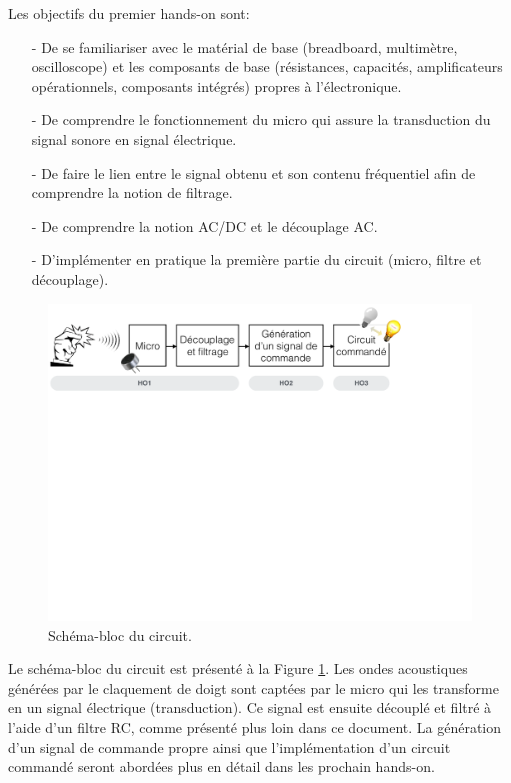 
Les objectifs du premier hands-on sont:

\begin{itemize}
	\item[-] De se familiariser avec le matérial de base (breadboard, multimètre, oscilloscope) et les composants de base (résistances, capacités, amplificateurs opérationnels, composants intégrés) propres à l'électronique.
	\item[-] De comprendre le fonctionnement du micro qui assure la transduction du signal sonore en signal électrique.
	\item[-] De faire le lien entre le signal obtenu et son contenu fréquentiel afin de comprendre la notion de filtrage.
	\item[-] De comprendre la notion AC/DC et le découplage AC.
	\item[-] D'implémenter en pratique la première partie du circuit (micro, filtre et découplage).
\end{itemize}

\begin{figure}[!ht]
	\centering
	\includegraphics[width=.75\textwidth]{figures/SchemaBloc.pdf}
	\caption{Schéma-bloc du circuit.}
	\label{fig:block-diagram}
\end{figure}

Le schéma-bloc du circuit est présenté à la Figure \ref{fig:block-diagram}. Les ondes acoustiques générées par le claquement de doigt sont captées par le micro qui les transforme en un signal électrique (transduction). Ce signal est ensuite découplé et filtré à l'aide d'un filtre RC, comme présenté plus loin dans ce document. La génération d'un signal de commande propre ainsi que l'implémentation d'un circuit commandé seront abordées plus en détail dans les prochain hands-on.
